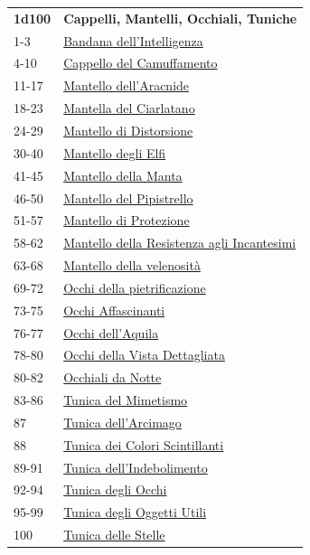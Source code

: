 \begin{multicols}{2}
{{\small\begin{tabularx}{0.45\textwidth}{lX}
\textbf{1d100} & \textbf{Cappelli, Mantelli, Occhiali, Tuniche}\\
1-3 & \hyperlink{Bandanadell'Intelligenza}{Bandana dell'Intelligenza}\\
4-10 & \hyperlink{CappellodelCamuffamento}{Cappello del Camuffamento}\\
11-17 & \hyperlink{Mantellodell'Aracnide}{Mantello dell'Aracnide}\\
18-23 & \hyperlink{MantelladelCiarlatano}{Mantella del Ciarlatano}\\
24-29 & \hyperlink{MantellodiDistorsione}{Mantello di Distorsione}\\
30-40 & \hyperlink{MantellodegliElfi}{Mantello degli Elfi}\\
41-45 & \hyperlink{MantellodellaManta}{Mantello della Manta}\\
46-50 & \hyperlink{MantellodelPipistrello}{Mantello del Pipistrello}\\
51-57 & \hyperlink{MantellodiProtezione}{Mantello di Protezione}\\
58-62 & \hyperlink{MantellodellaResistenzaagliIncantesimi}{Mantello della Resistenza agli Incantesimi}\\
63-68 & \hyperlink{Mantellodellavelenosità}{Mantello della velenosità}\\
69-72 & \hyperlink{Occhidellapietrificazione}{Occhi della pietrificazione}\\
73-75 & \hyperlink{OcchiAffascinanti}{Occhi Affascinanti}\\
76-77 & \hyperlink{Occhidell'Aquila}{Occhi dell'Aquila}\\
78-80 & \hyperlink{OcchidellaVistaDettagliata}{Occhi della Vista Dettagliata}\\
80-82 & \hyperlink{OcchialidaNotte}{Occhiali da Notte}\\
83-86 & \hyperlink{TunicadelMimetismo}{Tunica del Mimetismo}\\
87 & \hyperlink{Tunicadell'Arcimago}{Tunica dell'Arcimago}\\
88 & \hyperlink{TunicadeiColoriScintillanti}{Tunica dei Colori Scintillanti}\\
89-91 & \hyperlink{Tunicadell'Indebolimento}{Tunica dell'Indebolimento}\\
92-94 & \hyperlink{TunicadegliOcchi}{Tunica degli Occhi}\\
95-99 & \hyperlink{TunicadegliOggettiUtili}{Tunica degli Oggetti Utili}\\
100 & \hyperlink{TunicadelleStelle}{Tunica delle Stelle}
\end{tabularx}}

}
\end{multicols}
